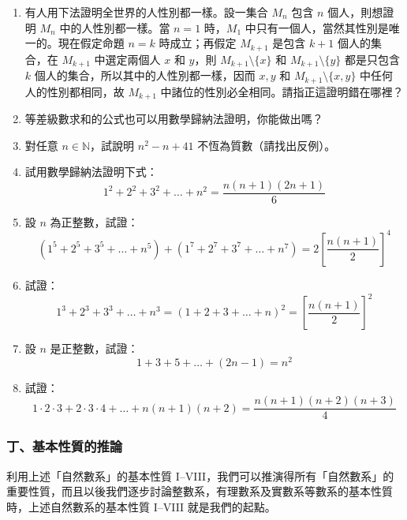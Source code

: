 \begin{enumerate}[1., leftmargin=2em]
  \item 有人用下法證明全世界的人性別都一樣。設一集合 $M_n$ 包含 $n$ 個人，則想證明 $M_n$ 中的人性別都一樣。當 $n=1$ 時，$M_1$ 中只有一個人，當然其性別是唯一的。現在假定命題 $n=k$ 時成立；再假定 $M_{k+1}$ 是包含 $k+1$ 個人的集合，在 $M_{k+1}$ 中選定兩個人 $x$ 和 $y$，則 $M_{k+1} \setminus \{x\}$ 和 $M_{k+1} \setminus \{y\}$ 都是只包含 $k$ 個人的集合，所以其中的人性別都一樣，因而 $x, y$ 和 $M_{k+1} \setminus \{x, y\}$ 中任何人的性別都相同，故 $M_{k+1}$ 中諸位的性別必全相同。請指正這證明錯在哪裡？
  \item 等差級數求和的公式也可以用數學歸納法證明，你能做出嗎？
  \item 對任意 $n \in \mathbb{N}$，試說明 $n^2 - n + 41$ 不恆為質數（請找出反例）。
  \item 試用數學歸納法證明下式：
  \begin{equation*}
    1^2 + 2^2 + 3^2 + \dots + n^2 = \frac{n(n+1)(2n+1)}{6}
  \end{equation*}
  \item 設 $n$ 為正整數，試證：
  \begin{equation*}
    (1^5 + 2^5 + 3^5 + \dots + n^5) + (1^7 + 2^7 + 3^7 + \dots + n^7) = 2 \left[\frac{n(n+1)}{2}\right]^4
  \end{equation*}
  \item 試證：
  \begin{equation*}
    1^3 + 2^3 + 3^3 + \dots + n^3 = (1+2+3+\dots+n)^2 = \left[\frac{n(n+1)}{2}\right]^2
  \end{equation*}
  \item 設 $n$ 是正整數，試證：
  \begin{equation*}
    1 + 3 + 5 + \dots + (2n-1) = n^2
  \end{equation*}
  \item 試證：
  \begin{equation*}
    1 \cdot 2 \cdot 3 + 2 \cdot 3 \cdot 4 + \dots + n(n+1)(n+2) = \frac{n(n+1)(n+2)(n+3)}{4}
  \end{equation*}
\end{enumerate}

\subsubsection*{丁、基本性質的推論}\label{subsec:nat_corollaries}

利用上述「自然數系」的基本性質 I--VIII，我們可以推演得所有「自然數系」的重要性質，而且以後我們逐步討論整數系，有理數系及實數系等數系的基本性質時，上述自然數系的基本性質 I--VIII 就是我們的起點。

